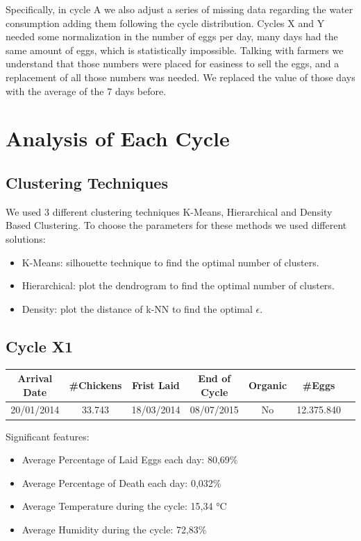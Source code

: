 \documentclass[11pt]{article}
\begin{document}
Specifically, in cycle A we also adjust a series of missing data regarding the water consumption adding them following the cycle distribution.
Cycles X and Y needed some normalization in the number of eggs per day, many days had the same amount of eggs, which is statistically impossible. Talking with farmers we understand that those numbers were placed for easiness to sell the eggs, and a replacement of all those numbers was needed. We replaced the value of those days with the average of the 7 days before.

\section{Analysis of Each Cycle}
\subsection{Clustering Techniques}
We used 3 different clustering techniques K-Means, Hierarchical and Density Based Clustering.
To choose the parameters for these methods we used different solutions:
\begin{itemize}
    \item K-Means: silhouette technique to find the optimal number of clusters.
    \item Hierarchical: plot the dendrogram to find the optimal number of clusters.
    \item Density: plot the distance of k-NN to find the optimal $\epsilon$.
\end{itemize}

\subsection{Cycle X1}
\begin{center}
    \begin{tabular}{| c | c | c | c | c | c | c |}
        \hline
        \textbf{Arrival Date} & \textbf{\#Chickens} & \textbf{Frist Laid} & \textbf{End of Cycle} & \textbf{Organic} & \textbf{\#Eggs}     \\ [0.5ex]
        \hline
        20/01/2014   & 33.743     & 18/03/2014 & 08/07/2015   & No      & 12.375.840 \\
        \hline
    \end{tabular}
\end{center}

Significant features:
\begin{itemize}
    \item Average Percentage of Laid Eggs each day: 80,69\%
    \item Average Percentage of Death each day: 0,032\%
    \item Average Temperature during the cycle: 15,34 °C
    \item Average Humidity during the cycle: 72,83\%
\end{itemize}
\end{document}
